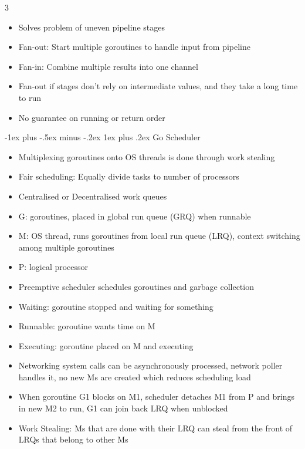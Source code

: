 \documentclass[10pt, landscape]{article}
\makeatletter
\renewcommand{\subsection}{\@startsection{subsection}{3}{0mm}%
                                {-1ex plus -.5ex minus -.2ex}%
                                {1ex plus .2ex}%
                                {\normalfont\small\bfseries}}%
\makeatother
\begin{document}
\begin{multicols*}{3}
\begin{itemize}
    \begin{itemize}
        \item Solves problem of uneven pipeline stages
        \item Fan-out: Start multiple goroutines to handle input from pipeline
        \item Fan-in: Combine multiple results into one channel
        \item Fan-out if stages don't rely on intermediate values, and they take a long time to run
        \item No guarantee on running or return order
    \end{itemize}
\end{itemize}

\subsection{Go Scheduler}
\begin{itemize}
    \item Multiplexing goroutines onto OS threads is done through work stealing
    \item Fair scheduling: Equally divide tasks to number of processors
    \item Centralised or Decentralised work queues
    \item G: goroutines, placed in global run queue (GRQ) when runnable
    \item M: OS thread, runs goroutines from local run queue (LRQ), context switching among multiple goroutines
    \item P: logical processor
    \item Preemptive scheduler schedules goroutines and garbage collection
    \item Waiting: goroutine stopped and waiting for something
    \item Runnable: goroutine wants time on M
    \item Executing: goroutine placed on M and executing
    \item Networking system calls can be asynchronously processed, network poller handles it, no new Ms are created which reduces scheduling load
    \item When goroutine G1 blocks on M1, scheduler detaches M1 from P and brings in new M2 to run, G1 can join back LRQ when unblocked
    \item Work Stealing: Ms that are done with their LRQ can steal from the front of LRQs that belong to other Ms
\end{itemize}


\end{multicols*}
\end{document}
